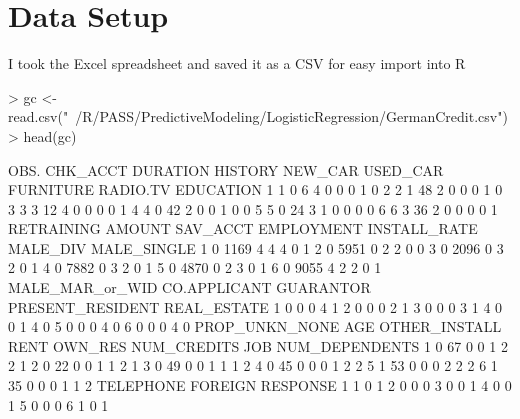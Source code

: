 \documentclass{article}
\begin{document}
\section*{Data Setup}
I took the Excel spreadsheet and saved it as a CSV for easy import into R
\begin{Schunk}
\begin{Sinput}
> gc <- read.csv("~/R/PASS/PredictiveModeling/LogisticRegression/GermanCredit.csv")
> head(gc)
\end{Sinput}
\begin{Soutput}
  OBS. CHK_ACCT DURATION HISTORY NEW_CAR USED_CAR FURNITURE RADIO.TV EDUCATION
1    1        0        6       4       0        0         0        1         0
2    2        1       48       2       0        0         0        1         0
3    3        3       12       4       0        0         0        0         1
4    4        0       42       2       0        0         1        0         0
5    5        0       24       3       1        0         0        0         0
6    6        3       36       2       0        0         0        0         1
  RETRAINING AMOUNT SAV_ACCT EMPLOYMENT INSTALL_RATE MALE_DIV MALE_SINGLE
1          0   1169        4          4            4        0           1
2          0   5951        0          2            2        0           0
3          0   2096        0          3            2        0           1
4          0   7882        0          3            2        0           1
5          0   4870        0          2            3        0           1
6          0   9055        4          2            2        0           1
  MALE_MAR_or_WID CO.APPLICANT GUARANTOR PRESENT_RESIDENT REAL_ESTATE
1               0            0         0                4           1
2               0            0         0                2           1
3               0            0         0                3           1
4               0            0         1                4           0
5               0            0         0                4           0
6               0            0         0                4           0
  PROP_UNKN_NONE AGE OTHER_INSTALL RENT OWN_RES NUM_CREDITS JOB NUM_DEPENDENTS
1              0  67             0    0       1           2   2              1
2              0  22             0    0       1           1   2              1
3              0  49             0    0       1           1   1              2
4              0  45             0    0       0           1   2              2
5              1  53             0    0       0           2   2              2
6              1  35             0    0       0           1   1              2
  TELEPHONE FOREIGN RESPONSE
1         1       0        1
2         0       0        0
3         0       0        1
4         0       0        1
5         0       0        0
6         1       0        1
\end{Soutput}
\end{Schunk}
\end{document}
